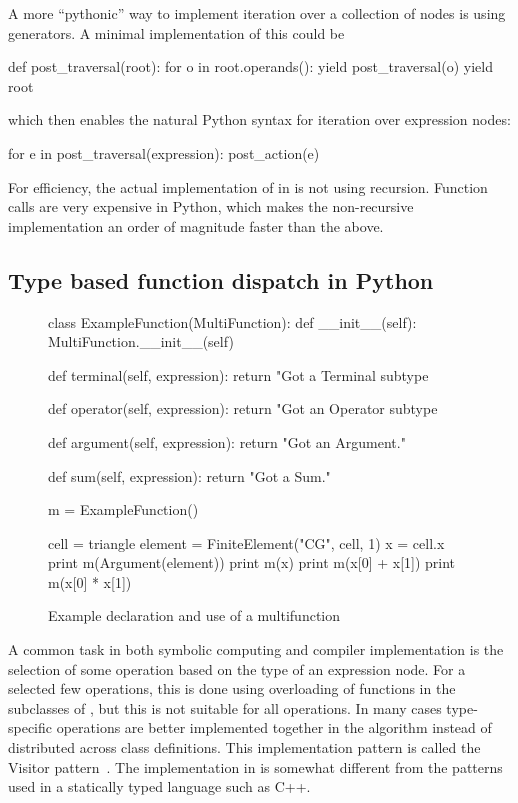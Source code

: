 A more ``pythonic'' way to implement iteration over a collection of
nodes is using generators.  A minimal implementation of this could be
\begin{python}
def post_traversal(root):
    for o in root.operands():
        yield post_traversal(o)
    yield root
\end{python}
which then enables the natural Python syntax for iteration over expression nodes:
\begin{python}
for e in post_traversal(expression):
    post_action(e)
\end{python}
For efficiency, the actual implementation of 
in \ufl{} is not using recursion.  Function calls are very expensive
in Python, which makes the non-recursive implementation an order of
magnitude faster than the above.

\subsection{Type based function dispatch in Python} \label{ufl:sec:multifunction}
\begin{figure}[ht]
\begin{python}
class ExampleFunction(MultiFunction):
    def __init__(self):
        MultiFunction.__init__(self)

    def terminal(self, expression):
        return "Got a Terminal subtype %

    def operator(self, expression):
        return "Got an Operator subtype %

    def argument(self, expression):
        return "Got an Argument."

    def sum(self, expression):
        return "Got a Sum."

m = ExampleFunction()

cell = triangle
element = FiniteElement("CG", cell, 1)
x = cell.x
print m(Argument(element))
print m(x)
print m(x[0] + x[1])
print m(x[0] * x[1])
\end{python}
\caption{Example declaration and use of a multifunction}
\label{ufl:fig:examplefunction}
\end{figure}

A common task in both symbolic computing and compiler implementation
is the selection of some operation based on the type of an expression
node.  For a selected few operations, this is done using overloading
of functions in the subclasses of , but this is not
suitable for all operations.  In many cases type-specific operations
are better implemented together in the algorithm instead of
distributed across class definitions.  This implementation pattern is
called the Visitor pattern~\cite{FIXMEGammaEtAl}. The implementation
in \ufl{} is somewhat different from the patterns used in a statically
typed language such as C++.

